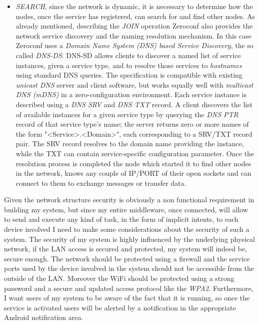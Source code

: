 \begin{itemize}
	\item \textit{SEARCH}, since the network is dynamic, it is necessary to determine how the nodes, once the service has registered, can search for and find other nodes. As already mentioned, describing the \textit{JOIN} operation Zeroconf also provides the network service discovery and the naming resolution mechanism. In this case Zeroconf uses a \textit{Domain Name System (DNS) based Service Discovery}, the so called \textit{DNS-DS}. DNS-SD allows clients to discover a named list of service instances, given a service type, and to resolve those services to \textit{hostnames} using standard DNS queries. The specification is compatible with existing \textit{unicast DNS} server and client software, but works equally well with \textit{multicast DNS (mDNS)} in a zero-configuration environment. Each service instance is described using a \textit{DNS SRV} and \textit{DNS TXT} record. A client discovers the list of available instances for a given service type by querying the \textit{DNS PTR} record of that service type's name; the server returns zero or more names of the form "<Service>.<Domain>", each corresponding to a SRV/TXT record pair. The SRV record resolves to the domain name providing the instance, while the TXT can contain service-specific configuration parameter. Once the resolution process is completed the node which started it to find other nodes in the network, knows any couple of IP/PORT of their open sockets and can connect to them to exchange messages or transfer data.
\end{itemize}
Given the network structure security is obviously a non functional requirement in building my system, but since my entire middleware, once connected, will allow to send and execute any kind of task, in the form of implicit intents, to each device involved I need to make some considerations about the security of such a system. The security of my system is highly influenced by the underlying physical network, if the LAN access is secured and protected, my system will indeed be, secure enough. The network should be protected using a firewall and the service ports used by the device involved in the system should not be accessible from the outside of the LAN. Moreover the WiFi should be protected using a strong password and a secure and updated access protocol like the \textit{WPA2}. Furthermore, I want users of my system to be aware of the fact that it is running, so once the service is activated users will be alerted by a notification in the appropriate Android notification area.
 

